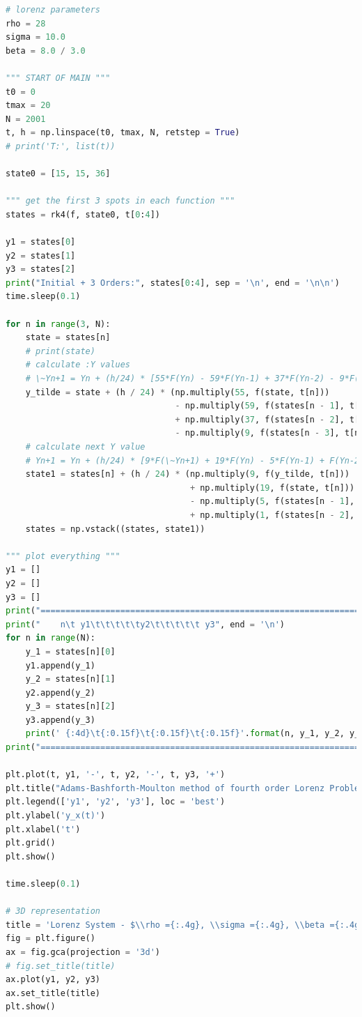 \documentclass[11pt]{article}
\begin{document}
\begin{lstlisting}[language=Python]
# lorenz parameters
rho = 28
sigma = 10.0
beta = 8.0 / 3.0

""" START OF MAIN """
t0 = 0
tmax = 20
N = 2001
t, h = np.linspace(t0, tmax, N, retstep = True)
# print('T:', list(t))

state0 = [15, 15, 36]

""" get the first 3 spots in each function """
states = rk4(f, state0, t[0:4])

y1 = states[0]
y2 = states[1]
y3 = states[2]
print("Initial + 3 Orders:", states[0:4], sep = '\n', end = '\n\n')
time.sleep(0.1)

for n in range(3, N):
    state = states[n]
    # print(state)
    # calculate :Y values
    # \~Yn+1 = Yn + (h/24) * [55*F(Yn) - 59*F(Yn-1) + 37*F(Yn-2) - 9*F(Yn-3)]
    y_tilde = state + (h / 24) * (np.multiply(55, f(state, t[n]))
                                  - np.multiply(59, f(states[n - 1], t[n]))
                                  + np.multiply(37, f(states[n - 2], t[n]))
                                  - np.multiply(9, f(states[n - 3], t[n])))
    # calculate next Y value
    # Yn+1 = Yn + (h/24) * [9*F(\~Yn+1) + 19*F(Yn) - 5*F(Yn-1) + F(Yn-2)]
    state1 = states[n] + (h / 24) * (np.multiply(9, f(y_tilde, t[n]))
                                     + np.multiply(19, f(state, t[n]))
                                     - np.multiply(5, f(states[n - 1], t[n]))
                                     + np.multiply(1, f(states[n - 2], t[n])))
    states = np.vstack((states, state1))

""" plot everything """
y1 = []
y2 = []
y3 = []
print("=========================================================================")
print("    n\t y1\t\t\t\t\ty2\t\t\t\t\t y3", end = '\n')
for n in range(N):
    y_1 = states[n][0]
    y1.append(y_1)
    y_2 = states[n][1]
    y2.append(y_2)
    y_3 = states[n][2]
    y3.append(y_3)
    print(' {:4d}\t{:0.15f}\t{:0.15f}\t{:0.15f}'.format(n, y_1, y_2, y_3))
print("=========================================================================")

plt.plot(t, y1, '-', t, y2, '-', t, y3, '+')
plt.title("Adams-Bashforth-Moulton method of fourth order Lorenz Problem")
plt.legend(['y1', 'y2', 'y3'], loc = 'best')
plt.ylabel('y_x(t)')
plt.xlabel('t')
plt.grid()
plt.show()

time.sleep(0.1)

# 3D representation
title = 'Lorenz System - $\\rho ={:.4g}, \\sigma ={:.4g}, \\beta ={:.4g}$'.format(rho, sigma, beta)
fig = plt.figure()
ax = fig.gca(projection = '3d')
# fig.set_title(title)
ax.plot(y1, y2, y3)
ax.set_title(title)
plt.show()

\end{lstlisting} 
\end{document}
